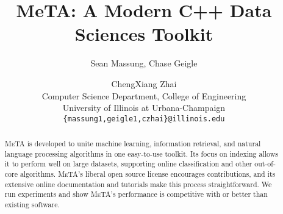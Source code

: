 \documentclass[11pt]{article}
\title{MeTA: A Modern C++ Data Sciences Toolkit} %
\author{Sean Massung, Chase Geigle \and ChengXiang Zhai \\
            Computer Science Department, College of Engineering \\
            University of Illinois at Urbana-Champaign \\
            {\tt \{massung1,geigle1,czhai\}@illinois.edu}
}
\date{}
\def\meta/{\textsc{MeTA}}
\begin{document}
\maketitle

\begin{abstract}
\meta/ is developed to unite machine learning, information retrieval, and
natural language processing algorithms in one easy-to-use toolkit. Its focus
on indexing allows it to perform well on large datasets, supporting online
classification and other out-of-core algorithms. \meta/'s liberal open
source license encourages contributions, and its extensive online
documentation and tutorials make this process straightforward. We run
experiments and show \meta/'s performance is competitive with or better than
existing software.
\end{abstract}










\end{document}
